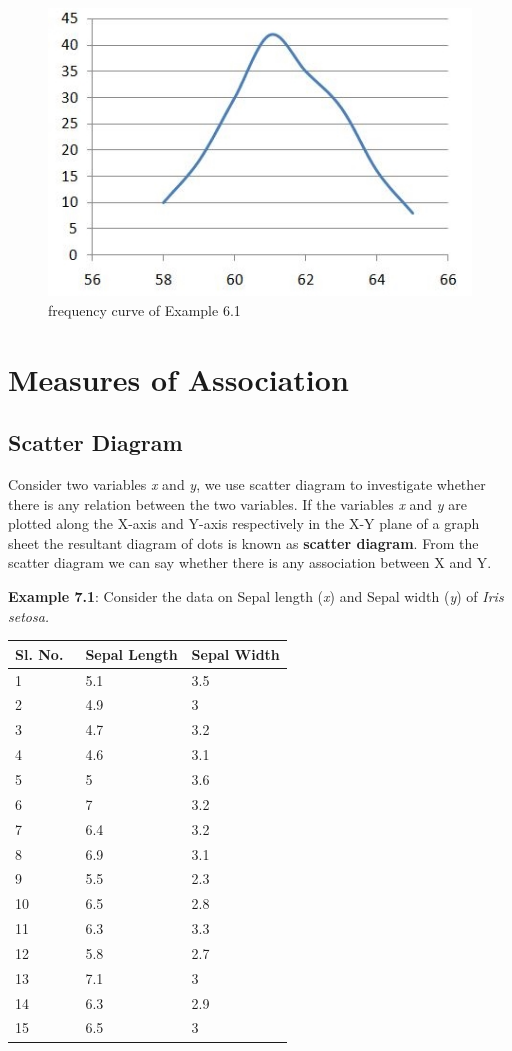 \documentclass[
]{book}
\begin{document}
\begin{figure}

{\centering \includegraphics[width=0.5\linewidth]{images/image11_5} 

}

\caption{frequency curve of Example 6.1}\label{fig:k2}
\end{figure}

\hypertarget{measures-of-association}{%
\chapter{Measures of Association}\label{measures-of-association}}

\hypertarget{scatter-diagram}{%
\section{Scatter Diagram}\label{scatter-diagram}}

Consider two variables \emph{x} and \emph{y}, we use scatter diagram to
investigate whether there is any relation between the two variables. If
the variables \emph{x} and \emph{y} are plotted along the X-axis and Y-axis
respectively in the X-Y plane of a graph sheet the resultant diagram of
dots is known as \textbf{scatter diagram}. From the scatter diagram we can
say whether there is any association between X and Y.

\textbf{Example 7.1}: Consider the data on Sepal length (\emph{x}) and Sepal width (\emph{y}) of \emph{Iris} \emph{setosa.}

\begin{longtable}[]{@{}lll@{}}
\toprule
Sl. No.~ & Sepal Length & Sepal Width \\
\midrule
\endhead
1 & 5.1 & 3.5 \\
2 & 4.9 & 3 \\
3 & 4.7 & 3.2 \\
4 & 4.6 & 3.1 \\
5 & 5 & 3.6 \\
6 & 7 & 3.2 \\
7 & 6.4 & 3.2 \\
8 & 6.9 & 3.1 \\
9 & 5.5 & 2.3 \\
10 & 6.5 & 2.8 \\
11 & 6.3 & 3.3 \\
12 & 5.8 & 2.7 \\
13 & 7.1 & 3 \\
14 & 6.3 & 2.9 \\
15 & 6.5 & 3 \\
\bottomrule
\end{longtable}
\end{document}
